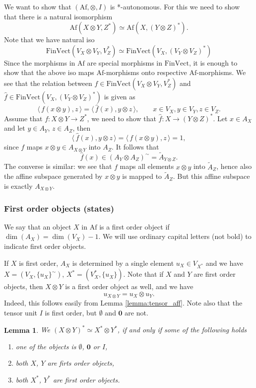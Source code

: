 \documentclass[12pt]{article}
\newtheorem{lemma}{Lemma}
\theoremstyle{definition}
\theoremstyle{remark}
\def\ii{\bm{\emptyset}}
\def\tt{\bm{0}}
\def\<{\langle\,}
\def\>{\,\rangle}
\def \Af{\mathrm{Af}}
\def \FV{\mathrm{FinVect}}
\def\bI{I}
\def\bX{ X}
\def\bY{ Y}
\def\bZ{Z}
\begin{document}
We want to show that $(\Af,\otimes,\bI)$ is *-autonomous. For this we need to show that there is a natural isomorphism
\[
\Af(\bX\otimes \bY,\bZ^*)\simeq \Af(\bX,(\bY\otimes \bZ)^*).
\]
Note that we have natural iso 
\[
\FV(V_{\bX}\otimes V_{\bY},V^*_{\bZ})\simeq \FV(V_\bX,(V_\bY\otimes V_\bZ)^*)
\]
Since the morphisms in $\Af$ are special morphisms in $\FV$, it is enough to show that the
above iso maps  $\Af$-morphisms onto respective $\Af$-morphisms. We see that the relation
between $f\in \FV(V_{\bX}\otimes V_{\bY},V^*_{\bZ})$ and $\hat f\in
\FV(V_\bX,(V_\bY\otimes V_\bZ)^*)$ is given as
\[
\<f(x\otimes y),z\>=\<{\hat f}(x),y\otimes z\>,\qquad x\in V_\bX, y\in V_\bY, z\in V_\bZ.
\]
Assume that $f: \bX\otimes \bY\to \bZ^*$, we need to show that $\hat f: \bX\to (\bY\otimes
\bZ)^*$. Let $x\in A_\bX$ and let $y\in A_\bY$, $z\in A_\bZ$, then
\[
\<\hat f(x),y\otimes z\>=\<f(x\otimes y),z\>=1,
\]
since $f$ maps $x\otimes y\in A_{\bX\otimes \bY}$ into $A_\bZ$. It follows that 
\[
\hat f(x)\in (A_\bY\otimes A_\bZ)^\sim=\tilde A_{\bY\otimes \bZ}.
\]
The converse is similar: we see that $f$ maps all elements $x\otimes y$ into $\tilde
A_\bZ$, hence also the affine subspace generated by $x\otimes y$ is mapped to $\tilde
A_\bZ$. But this affine subspace is exactly $A_{\bX\otimes \bY}$.



\subsubsection{First order objects (states)}

We say that an object  $\bX$ in $\Af$ is a first order object if
$\dim(A_\bX)=\dim(V_\bX)-1$. We will use ordinary capital letters (not bold) to indicate
first order objects.

If $X$ is first order, $A_X$ is determined by a single element 
$u_X\in V_{X^*}$ and we have  $X=(V_X,\{u_{X}\}^\sim)$, $X^*=(V_X^*,\{u_X\})$.  Note that if $X$ and $Y$ are
first order objects, then $X\otimes Y$ is a first order object as well, and we have
\[
u_{X\otimes Y}=u_{X}\otimes u_{Y}.
\]
Indeed,  this follows easily from Lemma \ref{lemma:tensor_aff}. Note also that the tensor
unit $\bI$ is first order, but $\ii$ and $\tt$ are not.

\begin{lemma}
We  $(\bX\otimes \bY)^*\simeq \bX^*\otimes \bY^*$,
if and only if some of the following holds
\begin{enumerate}
\item one of the objects is $\ii$, $\tt$ or $\bI$,
\item both $\bX$, $\bY$  are firts order objects,
\item both $\bX^*$, $\bY^*$ are first order objects.
\end{enumerate}


\end{lemma}
\end{document}
